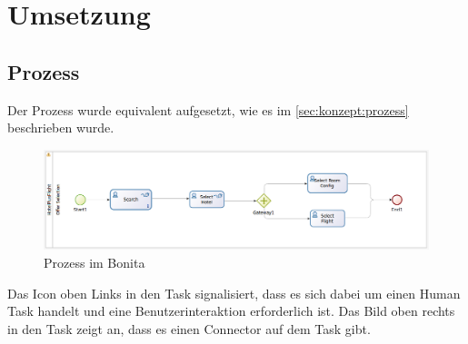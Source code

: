 

\chapter{Umsetzung}
\label{sec:umsetzung}

\section{Prozess}
Der Prozess wurde equivalent aufgesetzt, wie es im \cref{sec:konzept:prozess}  beschrieben wurde.

\begin{figure}[H]
	\centering
	\includegraphics[width=1\textwidth]{images/umsetzung-prozess.png}
	\caption{Prozess im Bonita}
	\label{fig:umsetzung:prozess}
\end{figure}
Das Icon oben Links in den Task signalisiert, dass es sich dabei um einen Human Task handelt und eine Benutzerinteraktion erforderlich ist. Das Bild oben rechts in den Task zeigt an, dass es einen Connector auf dem Task gibt.

